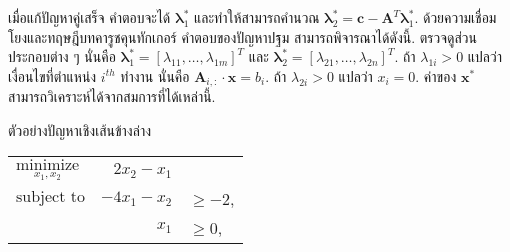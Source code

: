 \begin{Exercise}
เมื่อแก้ปัญหาคู่เสร็จ คำตอบจะได้ $\bm{\lambda}_1^\ast$ และทำให้สามารถคำนวณ $\bm{\lambda}_2^\ast = \bm{c} - \bm{A}^T \bm{\lambda}_1^\ast$.
ด้วยความเชื่อมโยงและทฤษฎีบทคารูชคุนทักเกอร์ คำตอบของปัญหาปฐม สามารถพิจารณาได้ดังนี้.
ตรวจดูส่วนประกอบต่าง ๆ นั่นคือ $\bm{\lambda}_1^\ast = [\lambda_{11}, \ldots, \lambda_{1m}]^T$
และ $\bm{\lambda}_2^\ast = [\lambda_{21}, \ldots, \lambda_{2n}]^T$.
ถ้า $\lambda_{1i} > 0$ แปลว่า เงื่อนไขที่ตำแหน่ง $i^{th}$ ทำงาน นั่นคือ $\bm{A}_{i,:} \cdot \bm{x} = b_i$.
ถ้า $\lambda_{2i} > 0$ แปลว่า $x_i = 0$.
ค่าของ $\bm{x}^\ast$ สามารถวิเคราะห์ได้จากสมการที่ได้เหล่านี้.

ตัวอย่างปัญหาเชิงเส้นข้างล่าง
%
\begin{center}
\begin{tabular}{lrl}
$\underset{x_1, x_2}{\mathrm{minimize}}$ & $2 x_2 - x_1$ & 
\\
$\mbox{subject to}$ & $-4 x_1 - x_2$ & $\geq -2$, 
\\
& $x_1$        & $\geq 0$,

\end{tabular}
\end{center}
\end{Exercise}
